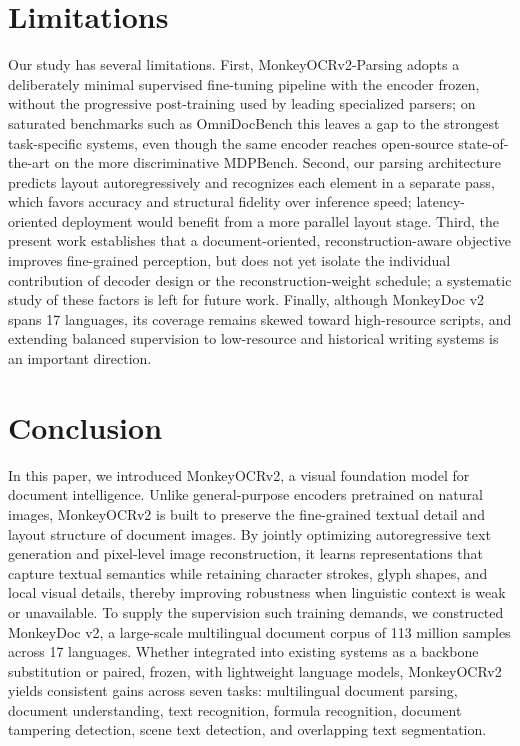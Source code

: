 \documentclass{article}
\begin{document}
\section{Limitations}
Our study has several limitations. First, MonkeyOCRv2-Parsing adopts a deliberately minimal supervised fine-tuning pipeline with the encoder frozen, without the progressive post-training used by leading specialized parsers; on saturated benchmarks such as OmniDocBench this leaves a gap to the strongest task-specific systems, even though the same encoder reaches open-source state-of-the-art on the more discriminative MDPBench. Second, our parsing architecture predicts layout autoregressively and recognizes each element in a separate pass, which favors accuracy and structural fidelity over inference speed; latency-oriented deployment would benefit from a more parallel layout stage. Third, the present work establishes that a document-oriented, reconstruction-aware objective improves fine-grained perception, but does not yet isolate the individual contribution of decoder design or the reconstruction-weight schedule; a systematic study of these factors is left for future work. Finally, although MonkeyDoc v2 spans 17 languages, its coverage remains skewed toward high-resource scripts, and extending balanced supervision to low-resource and historical writing systems is an important direction.

\section{Conclusion}
In this paper, we introduced MonkeyOCRv2, a visual foundation model for document intelligence. Unlike general-purpose encoders pretrained on natural images, MonkeyOCRv2 is built to preserve the fine-grained textual detail and layout structure of document images. 
By jointly optimizing autoregressive text generation and pixel-level image reconstruction, it learns representations that capture textual semantics while retaining character strokes, glyph shapes, and local visual details, thereby improving robustness when linguistic context is weak or unavailable.
To supply the supervision such training demands, we constructed MonkeyDoc v2, a large-scale multilingual document corpus of 113 million samples across 17 languages. 
Whether integrated into existing systems as a backbone substitution or paired, frozen, with lightweight language models, MonkeyOCRv2 yields consistent gains across seven tasks:
multilingual document parsing, document understanding, text recognition, formula recognition, document tampering detection, scene text detection, and overlapping text segmentation.
\end{document}
